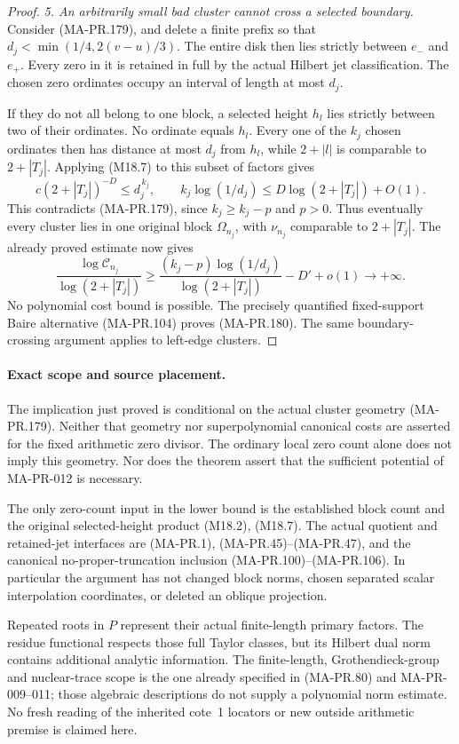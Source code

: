 \begin{proof}
\emph{5. An arbitrarily small bad cluster cannot cross a selected boundary.}
Consider (MA-PR.179), and delete a finite prefix
so that \(d_j<\min(1/4,2(v-u)/3)\).  The entire
disk then lies strictly between \(e_-\) and
\(e_+\).  Every zero in it is retained in full
by the actual Hilbert jet classification.
The chosen zero ordinates occupy an interval
of length at most \(d_j\).

If they do not all belong to one block, a
selected height \(h_l\) lies strictly between
two of their ordinates.  No ordinate equals
\(h_l\).  Every one of the \(k_j\) chosen
ordinates then has distance at most \(d_j\)
from \(h_l\), while \(2+|l|\) is comparable
to \(2+|T_j|\).  Applying (M18.7) to this
subset of factors gives
\[
       c(2+|T_j|)^{-D}
             \le d_j^{\,k_j},
 \qquad
       k_j\log(1/d_j)
             \le D\log(2+|T_j|)+O(1).
 \tag{MA-PR.193}
\]
This contradicts (MA-PR.179), since
\(k_j\ge k_j-p\) and \(p>0\).
Thus eventually every cluster lies in one
original block \(\Omega_{n_j}\), with
\(\nu_{n_j}\) comparable to \(2+|T_j|\).
The already proved estimate now gives
\[
 \frac{\log\mathcal C_{n_j}}
                   {\log(2+|T_j|)}
 \ge
 \frac{(k_j-p)\log(1/d_j)}
                   {\log(2+|T_j|)}
                  -D'+o(1)
       \longrightarrow+\infty .
 \tag{MA-PR.194}
\]
No polynomial cost bound is possible.  The
precisely quantified fixed-support Baire
alternative (MA-PR.104) proves (MA-PR.180).
The same boundary-crossing argument applies
to left-edge clusters.
\end{proof}

\paragraph{Exact scope and source placement.}
The implication just proved is conditional on
the actual cluster geometry (MA-PR.179).
Neither that geometry nor superpolynomial
canonical costs are asserted for the fixed
arithmetic zero divisor.  The ordinary local
zero count alone does not imply this geometry.
Nor does the theorem assert that the sufficient
potential of MA-PR-012 is necessary.

The only zero-count input in the lower bound is
the established block count and the original
selected-height product (M18.2), (M18.7).
The actual quotient and retained-jet interfaces
are (MA-PR.1), (MA-PR.45)--(MA-PR.47), and
the canonical no-proper-truncation inclusion
(MA-PR.100)--(MA-PR.106).  In particular the
argument has not changed block norms, chosen
separated scalar interpolation coordinates, or
deleted an oblique projection.

Repeated roots in \(P\) represent their actual
finite-length primary factors.  The residue
functional respects those full Taylor classes,
but its Hilbert dual norm contains additional
analytic information.  The finite-length,
Grothendieck-group and nuclear-trace scope is
the one already specified in (MA-PR.80) and
MA-PR-009--011; those algebraic descriptions
do not supply a polynomial norm estimate.
No fresh reading of the inherited cote~1
locators or new outside arithmetic premise
is claimed here.
